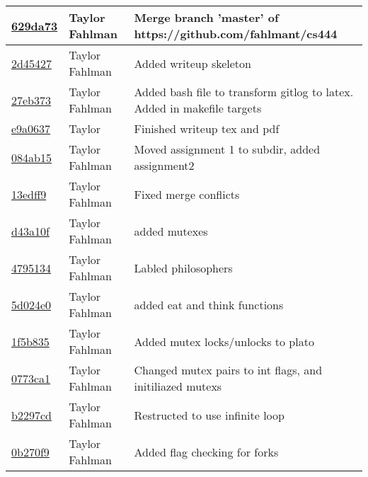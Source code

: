 \begin{tabular}{l l l}
\href{https://github.com/fahlmant/cs444/commit/629da73d1a287be9db4919d9bc27c987acfb7128}{629da73} & Taylor Fahlman & Merge branch 'master' of https://github.com/fahlmant/cs444\\\hline
\href{https://github.com/fahlmant/cs444/commit/2d454270c6b79091f4c1363da7185e3ffbcb2301}{2d45427} & Taylor Fahlman & Added writeup skeleton\\\hline
\href{https://github.com/fahlmant/cs444/commit/27eb37349447092eec979e1d09531408f38ac661}{27eb373} & Taylor Fahlman & Added bash file to transform gitlog to latex. Added in makefile targets\\\hline
\href{https://github.com/fahlmant/cs444/commit/e9a06375c5e5ee5232d5a3a71fa1dd1ac336b7cc}{e9a0637} & Taylor & Finished writeup tex and pdf\\\hline
\href{https://github.com/fahlmant/cs444/commit/084ab1563492ad141bbbf835df613426e6070df2}{084ab15} & Taylor Fahlman & Moved assignment 1 to subdir, added assignment2\\\hline
\href{https://github.com/fahlmant/cs444/commit/13edff973f75105ee082af2453bb0ea1789c6823}{13edff9} & Taylor Fahlman & Fixed merge conflicts\\\hline
\href{https://github.com/fahlmant/cs444/commit/d43a10f1ac0ff2b53122ca42969b95d5e5b474b9}{d43a10f} & Taylor Fahlman & added mutexes\\\hline
\href{https://github.com/fahlmant/cs444/commit/4795134ae4187793f395617ba52841d7c9e7f6d1}{4795134} & Taylor Fahlman & Labled philosophers\\\hline
\href{https://github.com/fahlmant/cs444/commit/5d024e0d8a49d0db3b239929402e049376df57e1}{5d024e0} & Taylor Fahlman & added eat and think functions\\\hline
\href{https://github.com/fahlmant/cs444/commit/1f5b835fc8b41d44ee33a2f2e6f5ec916591957a}{1f5b835} & Taylor Fahlman & Added mutex locks/unlocks to plato\\\hline
\href{https://github.com/fahlmant/cs444/commit/0773ca18437eb1aff2874e73ff18fe67681602dc}{0773ca1} & Taylor Fahlman & Changed mutex pairs to int flags, and initiliazed mutexs\\\hline
\href{https://github.com/fahlmant/cs444/commit/b2297cd2ec70c735e39a1cc26d5ff39478f011bf}{b2297cd} & Taylor Fahlman & Restructed to use infinite loop\\\hline
\href{https://github.com/fahlmant/cs444/commit/0b270f9d732ab6a652aaba7f6947f13c0e9cdc46}{0b270f9} & Taylor Fahlman & Added flag checking for forks\\\hline

\end{tabular}

